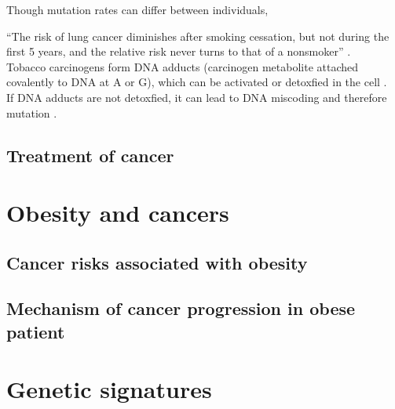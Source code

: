 Though mutation rates can differ between individuals, 


``The risk of lung cancer diminishes after smoking cessation, but not during the first 5 years, and the relative risk never turns to that of a nonsmoker'' \citep{Hecht1999}. \\

Tobacco carcinogens form DNA adducts (carcinogen metabolite attached covalently to DNA at A or G), which can be activated or detoxfied in the cell \citep{Hecht1999}. \\

If DNA adducts are not detoxfied, it can lead to DNA miscoding and therefore mutation \citep{Hecht1999}. \\


\subsection{Treatment of cancer}
\label{sub:treatment_of_cancer}




\section{Obesity and cancers}
\label{sec:obesity_and_cancers}

\subsection{Cancer risks associated with obesity}
\label{sub:cancer_risks_associated_with_obesity}

\citep{Calle2003}

\subsection{Mechanism of cancer progression in obese patient}
\label{sub:mechanism_of_cancer_progression_in_obese_patient}





\section{Genetic signatures}
\label{sec:genetic_signatures}

